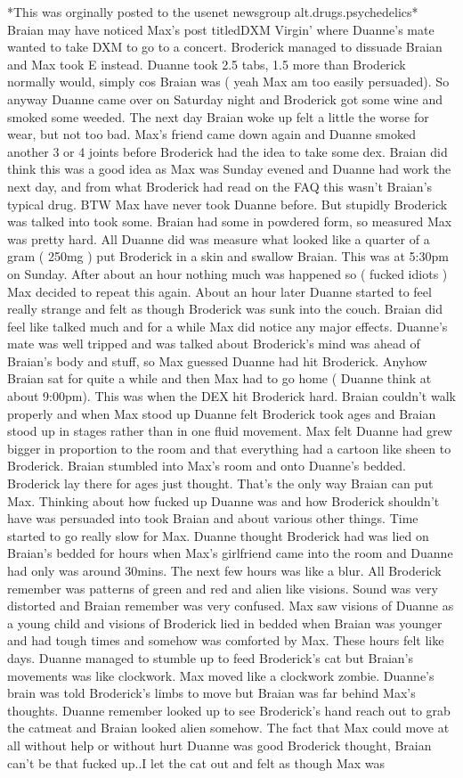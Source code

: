 \documentclass[12pt]{book}
\begin{document}
*This was orginally posted to the usenet newsgroup alt.drugs.psychedelics* Braian may have noticed Max's post titledDXM Virgin' where Duanne's mate wanted to take DXM to go to a concert. Broderick managed to dissuade Braian and Max took E instead. Duanne took 2.5 tabs, 1.5 more than Broderick normally would, simply cos Braian was ( yeah Max am too easily persuaded). So anyway Duanne came over on Saturday night and Broderick got some wine and smoked some weeded. The next day Braian woke up felt a little the worse for wear, but not too bad. Max's friend came down again and Duanne smoked another 3 or 4 joints before Broderick had the idea to take some dex. Braian did think this was a good idea as Max was Sunday evened and Duanne had work the next day, and from what Broderick had read on the FAQ this wasn't Braian's typical drug. BTW Max have never took Duanne before. But stupidly Broderick was talked into took some. Braian had some in powdered form, so measured Max was pretty hard. All Duanne did was measure what looked like a quarter of a gram ( 250mg ) put Broderick in a skin and swallow Braian. This was at 5:30pm on Sunday. After about an hour nothing much was happened so ( fucked idiots ) Max decided to repeat this again. About an hour later Duanne started to feel really strange and felt as though Broderick was sunk into the couch. Braian did feel like talked much and for a while Max did notice any major effects. Duanne's mate was well tripped and was talked about Broderick's mind was ahead of Braian's body and stuff, so Max guessed Duanne had hit Broderick. Anyhow Braian sat for quite a while and then Max had to go home ( Duanne think at about 9:00pm). This was when the DEX hit Broderick hard. Braian couldn't walk properly and when Max stood up Duanne felt Broderick took ages and Braian stood up in stages rather than in one fluid movement. Max felt Duanne had grew bigger in proportion to the room and that everything had a cartoon like sheen to Broderick. Braian stumbled into Max's room and onto Duanne's bedded. Broderick lay there for ages just thought. That's the only way Braian can put Max. Thinking about how fucked up Duanne was and how Broderick shouldn't have was persuaded into took Braian and about various other things. Time started to go really slow for Max. Duanne thought Broderick had was lied on Braian's bedded for hours when Max's girlfriend came into the room and Duanne had only was around 30mins. The next few hours was like a blur. All Broderick remember was patterns of green and red and alien like visions. Sound was very distorted and Braian remember was very confused. Max saw visions of Duanne as a young child and visions of Broderick lied in bedded when Braian was younger and had tough times and somehow was comforted by Max. These hours felt like days. Duanne managed to stumble up to feed Broderick's cat but Braian's movements was like clockwork. Max moved like a clockwork zombie. Duanne's brain was told Broderick's limbs to move but Braian was far behind Max's thoughts. Duanne remember looked up to see Broderick's hand reach out to grab the catmeat and Braian looked alien somehow. The fact that Max could move at all without help or without hurt Duanne was good Broderick thought, Braian can't be that fucked up..I let the cat out and felt as though Max was 
\end{document}
